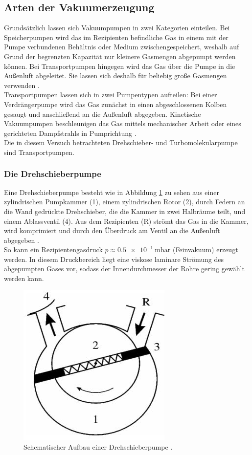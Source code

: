 \subsection{Arten der Vakuumerzeugung}

Grundsätzlich lassen sich Vakuumpumpen in zwei Kategorien einteilen.
Bei Speicherpumpen wird das im Rezipienten befindliche Gas in einem mit der Pumpe verbundenen Behältnis oder Medium zwischengespeichert, weshalb auf Grund der begrenzten Kapazität nur kleinere Gasmengen abgepumpt werden können.
Bei Transportpumpen hingegen wird das Gas über die Pumpe in die Außenluft abgeleitet. Sie lassen sich deshalb für beliebig große Gasmengen verwenden \cite{Jena}.\\
Transportpumpen lassen sich in zwei Pumpentypen aufteilen: Bei einer Verdrängerpumpe wird das Gas zunächst in einen abgeschlossenen Kolben gesaugt und anschließend an die Außenluft abgegeben. Kinetische Vakuumpumpen beschleunigen das Gas mittels mechanischer Arbeit oder eines gerichteten Dampfstrahls in Pumprichtung \cite{Pfeiffer}.\\
Die in diesem Versuch betrachteten Drehschieber- und Turbomolekularpumpe sind Transportpumpen.

\subsubsection{Die Drehschieberpumpe}

Eine Drehschieberpumpe besteht wie in Abbildung \ref{fig:DSP} zu sehen aus einer zylindrischen Pumpkammer (1), einem zylindrischen Rotor (2), durch Federn an die Wand gedrückte Drehschieber, die die Kammer in zwei Halbräume teilt, und einem Ablassventil (4). Aus dem Rezipienten (R) strömt das Gas in die Kammer, wird komprimiert und durch den Überdruck am Ventil an die Außenluft abgegeben \cite{Jena}.\\
So kann ein Rezipientengasdruck $p\approx \SI{0,5e-1}{\milli\bar}$ (Feinvakuum) erzeugt werden.
In diesem Druckbereich liegt eine viskose laminare Strömung des abgepumpten Gases vor, sodass der Innendurchmesser der Rohre gering gewählt werden kann.
\begin{figure}
\centering
\includegraphics[scale=0.5]{content/images/Drehschieber.jpg}
\caption{Schematischer Aufbau einer Drehschieberpumpe \cite{Jena}.}
\label{fig:DSP}
\end{figure}

